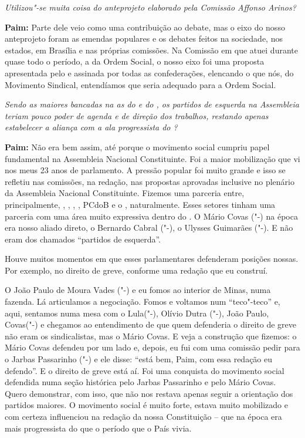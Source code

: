 \emph{Utilizou"-se muita coisa do anteprojeto elaborado pela Comissão
Affonso Arinos?}

\textbf{Paim:} Parte dele veio como uma contribuição ao debate, mas o
eixo do nosso anteprojeto foram as emendas populares e os debates feitos
na sociedade, nos estados, em Brasília e nas próprias comissões. Na
Comissão em que atuei durante quase todo o período, a da Ordem Social, o
nosso eixo foi uma proposta apresentada pelo  e assinada por todas
as confederações, elencando o que nós, do Movimento Sindical,
entendíamos que seria adequado para a Ordem Social.

\emph{Sendo as maiores bancadas na  as do  e do , os
partidos de esquerda na Assembleia teriam pouco poder de agenda e de
direção dos trabalhos, restando apenas estabelecer a aliança com a ala
progressista do ? }

\textbf{Paim:} Não era bem assim, até porque o movimento social cumpriu
papel fundamental na Assembleia Nacional Constituinte. Foi a maior
mobilização que vi nos meus 23 anos de parlamento. A pressão popular foi
muito grande e isso se refletiu nas comissões, na redação, nas propostas
aprovadas inclusive no plenário da Assembleia Nacional Constituinte.
Fizemos uma parceria entre, principalmente, , , , , PCdoB e
o , naturalmente. Esses setores tinham uma parceria com uma área muito
expressiva dentro do . O Mário Covas ("-) na época era nosso
aliado direto, o Bernardo Cabral ("-), o Ulysses Guimarães
("-). E não eram dos chamados ``partidos de esquerda''.

Houve muitos momentos em que esses parlamentares defenderam posições
nossas. Por exemplo, no direito de greve, conforme uma redação que eu
construí.

O João Paulo de Moura Vades ("-) e eu fomos ao interior de Minas,
numa fazenda. Lá articulamos a negociação. Fomos e voltamos num
``teco"-teco'' e, aqui, sentamos numa mesa com o Lula("-), Olívio
Dutra ("-), João Paulo, Covas("-) e chegamos ao entendimento de
que quem defenderia o direito de greve não eram os sindicalistas, mas o
Mário Covas. E veja a construção que fizemos: o Mário Covas defendeu por
um lado e, depois, eu fui com uma comissão pedir para o Jarbas
Passarinho ("-) e ele disse: ``está bem, Paim, com essa redação eu
defendo''. E o direito de greve está aí. Foi uma conquista do movimento
social defendida numa seção histórica pelo Jarbas Passarinho e pelo
Mário Covas. Quero demonstrar, com isso, que não nos restava apenas
seguir a orientação dos partidos maiores. O movimento social é muito
forte, estava muito mobilizado e com certeza influenciou na redação da
nossa Constituição -- que na época era mais progressista do que o
período que o País vivia.

